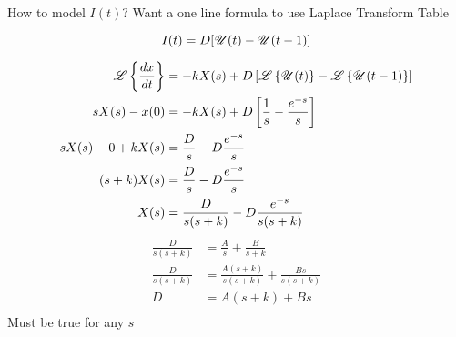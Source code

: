 \documentclass[
	date={September 16{,} 2024}
]{math486notes}
\begin{document}
How to model $I(t)$?
Want a one line formula to use Laplace Transform Table

\begin{equation}
	I(t) = D[ \mathscr{U}(t) - \mathscr{U}(t-1) ]
	\label{eq:}
\end{equation}

\begin{equation*}
\begin{aligned}
	\laplace[ \frac{dx}{dt} ] &= -kX(s) + D\left[ \laplace[\unitstep(t)] - \laplace[\unitstep(t-1)] \right]\\
	sX(s) - x(0) &= -kX(s) + D\left[ \frac{1}{s} - \frac{e^{-s}}{s} \right]\\
	sX(s) - 0 + kX(s) &= \frac{D}{s} - D\frac{e^{-s}}{s}\\
	(s+k)X(s) &= \frac{D}{s} - D\frac{e^{-s}}{s}\\
	X(s) &= \frac{D}{s(s+k)} - D\frac{e^{-s}}{s(s+k)}\\
\end{aligned}
\end{equation*}
\begin{equation*}
\begin{aligned}
	\frac{D}{s(s+k)} &= \frac{A}{s} + \frac{B}{s+k}\\
	\frac{D}{s(s+k)} &= \frac{A(s+k)}{s(s+k)} + \frac{Bs}{s(s+k)}\\
	D &= A(s+k) + Bs\\
\end{aligned}
\end{equation*}
Must be true for any $s$
\end{document}
